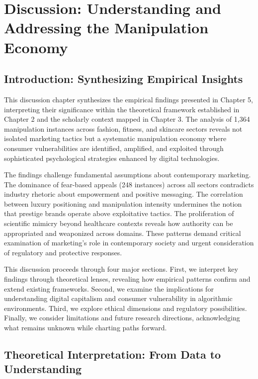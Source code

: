 
\chapter{Discussion: Understanding and Addressing the Manipulation Economy}
\label{ch:discussion}

\section{Introduction: Synthesizing Empirical Insights}
\label{sec:discussion_intro}

This discussion chapter synthesizes the empirical findings presented in Chapter 5, interpreting their significance within the theoretical framework established in Chapter 2 and the scholarly context mapped in Chapter 3. The analysis of 1,364 manipulation instances across fashion, fitness, and skincare sectors reveals not isolated marketing tactics but a systematic manipulation economy where consumer vulnerabilities are identified, amplified, and exploited through sophisticated psychological strategies enhanced by digital technologies.

The findings challenge fundamental assumptions about contemporary marketing. The dominance of fear-based appeals (248 instances) across all sectors contradicts industry rhetoric about empowerment and positive messaging. The correlation between luxury positioning and manipulation intensity undermines the notion that prestige brands operate above exploitative tactics. The proliferation of scientific mimicry beyond healthcare contexts reveals how authority can be appropriated and weaponized across domains. These patterns demand critical examination of marketing's role in contemporary society and urgent consideration of regulatory and protective responses.

This discussion proceeds through four major sections. First, we interpret key findings through theoretical lenses, revealing how empirical patterns confirm and extend existing frameworks. Second, we examine the implications for understanding digital capitalism and consumer vulnerability in algorithmic environments. Third, we explore ethical dimensions and regulatory possibilities. Finally, we consider limitations and future research directions, acknowledging what remains unknown while charting paths forward.

\section{Theoretical Interpretation: From Data to Understanding}
\label{sec:theoretical_interpretation}


